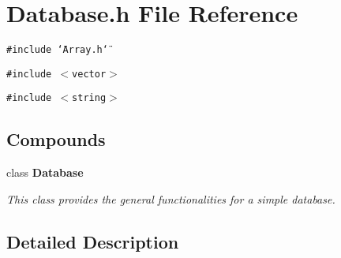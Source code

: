 \section{Database.h File Reference}
\label{Database_8h}
{\tt \#include \char`\"{}Array.h\char`\"{}}\par
{\tt \#include $<$vector$>$}\par
{\tt \#include $<$string$>$}\par
\subsection*{Compounds}
\begin{CompactItemize}
\item 
class {\bf Database}
\begin{CompactList}\small\item\em This class provides the general functionalities for a simple database.\item\end{CompactList}\end{CompactItemize}


\subsection{Detailed Description}


